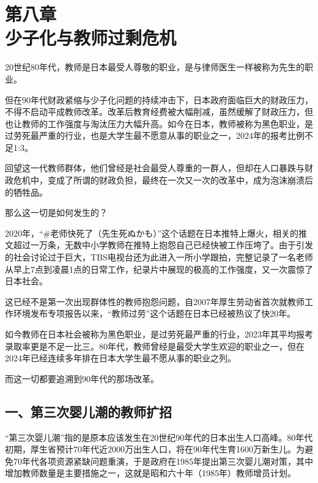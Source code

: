 

\section[第八章\q 少子化与教师过剩危机]{第八章\\ 少子化与教师过剩危机}


{\fangsong 20世纪80年代，教师是日本最受人尊敬的职业，是与律师医生一样被称为先生的职业。\par}

{\fangsong 但在90年代财政紧缩与少子化问题的持续冲击下，日本政府面临巨大的财政压力，不得不启动平成教师改革。改革后教育经费被大幅削减，虽然缓解了财政压力，但也让教师的工作强度与淘汰压力大幅升高。如今在日本，教师被称为黑色职业，是过劳死最严重的行业，也是大学生最不愿意从事的职业之一，2024年的报考比例不足1:3。\par}

{\fangsong 回望这一代教师群体，他们曾经是社会最受人尊重的一群人，但却在人口暴跌与财政危机中，变成了所谓的财政负担，最终在一次又一次的改革中，成为泡沫崩溃后的牺牲品。\par}

{\fangsong 那么这一切是如何发生的？\par}

2020年，“\#老师快死了（先生死ぬかも）”这个话题在日本推特上爆火，相关的推文超过一万条，无数中小学教师在推特上抱怨自己已经快被工作压垮了。由于引发的社会讨论过于巨大，TBS电视台还为此进入一所小学跟拍，完整记录了一名老师从早上7点到凌晨1点的日常工作，纪录片中展现的极高的工作强度，又一次震惊了日本社会。

这已经不是第一次出现群体性的教师抱怨问题，自2007年厚生劳动省首次就教师工作环境发布专项报告以来，“教师过劳”这个话题在日本已经被热议了快20年。

如今教师在日本社会被称为黑色职业，是过劳死最严重的行业，2023年其平均报考录取率更是不足一比三。80年代，教师曾经是最受大学生欢迎的职业之一，但在2024年已经连续多年排在日本大学生最不愿从事的职业之列。

而这一切都要追溯到90年代的那场改革。

\subsection{一、第三次婴儿潮的教师扩招}

“第三次婴儿潮”指的是原本应该发生在20世纪90年代的日本出生人口高峰。80年代初期，厚生省预计70年代近2000万出生人口，将在90年代生育1600万新生儿。为避免70年代各项资源紧缺问题重演，于是政府在1985年提出第三次婴儿潮对策，其中增加教师数量是主要措施之一，这就是昭和六十年（1985年）教师增员计划。

